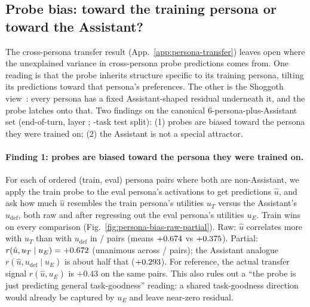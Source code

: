 \documentclass{article}
\begin{document}
\subsection{Probe bias: toward the training persona or toward the Assistant?}
\label{app:persona-bias}

The cross-persona transfer result (App.~\ref{app:persona-transfer}) leaves open where the unexplained variance in cross-persona probe predictions comes from. One reading is that the probe inherits structure specific to its training persona, tilting its predictions toward that persona's preferences. The other is the Shoggoth view~\citep{janus2022simulators}: every persona has a fixed Assistant-shaped residual underneath it, and the probe latches onto that. Two findings on the canonical 6-persona-plus-Assistant set (end-of-turn, layer \gemmaClassificationProbeLayer; \canonicalSplitTestSize-task test split): (1) probes are biased toward the persona they were trained on; (2) the Assistant is not a special attractor.

\paragraph{Finding 1: probes are biased toward the persona they were trained on.}
For each of \corrBiasNonDefaultPairCount{} ordered (train, eval) persona pairs where both are non-Assistant, we apply the train probe to the eval persona's activations to get predictions $\hat u$, and ask how much $\hat u$ resembles the train persona's utilities $u_T$ versus the Assistant's $u_{\text{def}}$, both raw and after regressing out the eval persona's utilities $u_E$. Train wins on every comparison (Fig.~\ref{fig:persona-bias-raw-partial}). Raw: $\hat u$ correlates more with $u_T$ than with $u_{\text{def}}$ in \corrBiasRawPairsOnTrainFavouringSide/\corrBiasNonDefaultPairCount{} pairs (means $+0.674$ vs $+0.375$). Partial: $r(\hat u, u_T \mid u_E) = +0.672$ (unanimous across \corrBiasPartialPairsOnTrainFavouringSide/\corrBiasNonDefaultPairCount{} pairs); the Assistant analogue $r(\hat u, u_{\text{def}} \mid u_E)$ is about half that ($+0.293$). For reference, the actual transfer signal $r(\hat u, u_E)$ is $+0.43$ on the same pairs. This also rules out a ``the probe is just predicting general task-goodness'' reading: a shared task-goodness direction would already be captured by $u_E$ and leave near-zero residual.
\end{document}

